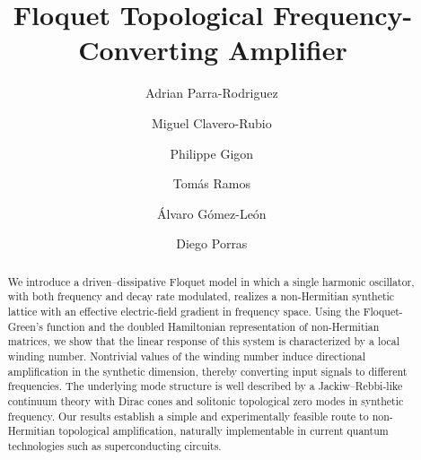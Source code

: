 \documentclass[a4paper,twocolumn,floatfix,10pt,superscriptaddress]%
{quantumarticle}
\begin{document}
\title{Floquet Topological Frequency-Converting Amplifier}

\author{Adrian Parra-Rodriguez\,}
\author{Miguel Clavero-Rubio\,}
\author{Philippe Gigon\,}
\author{Tom\'as Ramos\,}
\author{Álvaro Gómez-León\,}
\author{Diego Porras\,}

\begin{abstract}
We introduce a driven–dissipative Floquet model in which a single harmonic oscillator, with both frequency and decay rate modulated, realizes a non-Hermitian synthetic lattice with an effective electric-field gradient in frequency space. Using the Floquet-Green's function and the doubled Hamiltonian representation of non-Hermitian matrices, we show that the linear response of this system is characterized by a local winding number. Nontrivial values of the winding number induce directional amplification in the synthetic dimension, thereby converting input signals to different frequencies. The underlying mode structure is well described by a Jackiw–Rebbi-like continuum theory with Dirac cones and solitonic topological zero modes in synthetic frequency. Our results establish a simple and experimentally feasible route to non-Hermitian topological amplification, naturally implementable in current quantum technologies such as superconducting circuits.
\end{abstract}
\end{document}
